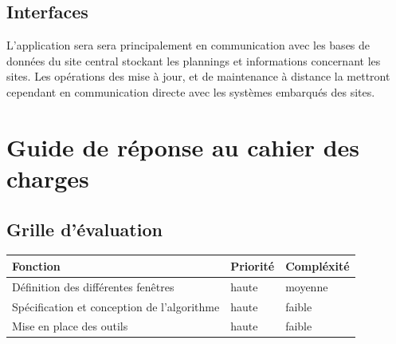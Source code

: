 \subsection{Interfaces}
L'application sera sera principalement en communication avec les bases de données du site central stockant les plannings et informations concernant les sites. Les opérations des mise à jour, et de maintenance à distance la mettront cependant en communication directe avec les systèmes embarqués des sites.

\section{Guide de réponse au cahier des charges}
\subsection{Grille d'évaluation}
	\begin{tabular}{l l l}
	\hline
	Fonction & Priorité & Compléxité \\
	\hline
	Définition des différentes fenêtres & haute & moyenne \\
	Spécification et conception de l'algorithme & haute & faible \\
	Mise en place des outils & haute & faible \\
	
	\hline
            
        \end{tabular}
